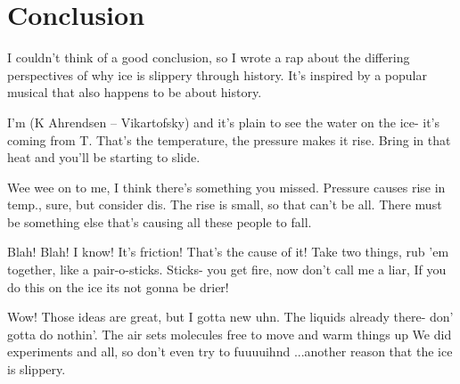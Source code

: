 \documentclass[12pt]{article}
\begin{document}
\section{Conclusion}
I couldn't think of a good conclusion, so I wrote a rap
about the differing perspectives of why ice is slippery 
through history. It's inspired by a popular musical that
also happens to be about history.

I'm (K Ahrendsen -- Vikartofsky) and it's plain to see 
the water on the ice- it's coming from T.
That's the temperature, the pressure makes it rise. 
Bring in that heat and you'll be starting to slide. 

Wee wee on to me, I think there's something you missed.
Pressure causes rise in temp., sure, but consider dis.
The rise is small, so that can't be all. 
There must be something else that's causing all these people to fall. 

Blah! Blah! I know! It's friction! That's the cause of it!
Take two things, rub 'em together, like a pair-o-sticks.
Sticks- you get fire, now don't call me a liar,
If you do this on the ice its not gonna be drier!

Wow! Those ideas are great, but I gotta new uhn.
The liquids already there- don' gotta do nothin'.
The air sets molecules free to move and warm things up
We did experiments and all, so don't even try to fuuuuihnd
...another reason that the ice is slippery.
\end{document}
